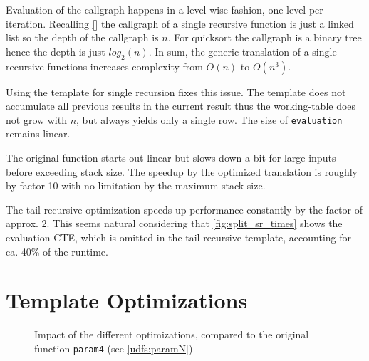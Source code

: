Evaluation of the callgraph happens in a level-wise fashion, one level per iteration. Recalling \autoref{} the callgraph of a single recursive function is just a linked list so the depth of the callgraph is $n$. For quicksort the callgraph is a binary tree hence the depth is just $log_2(n)$. In sum, the generic translation of a single recursive functions increases complexity from $O(n)$ to $O(n^3)$.

Using the template for single recursion fixes this issue. The template does not accumulate all previous results in the current result thus the working-table does not grow with $n$, but always yields only a single row. The size of \texttt{evaluation} remains linear.

The original function starts out linear but slows down a bit for large inputs before exceeding stack size. The speedup by the optimized translation is roughly by factor 10 with no limitation by the maximum stack size.

The tail recursive optimization speeds up performance constantly by the factor of approx. 2. This seems natural considering that \autoref{fig:split_sr_times} shows the evaluation-CTE, which is omitted in the tail recursive template, accounting for ca. 40\% of the runtime.

\section{Template Optimizations}


\begin{figure}[h!]
    \centering\small
    
    \caption{Impact of the different optimizations, compared to the original function \texttt{param4} (see \autoref{udfs:paramN})}
    \label{fig:paramN}
\end{figure}



